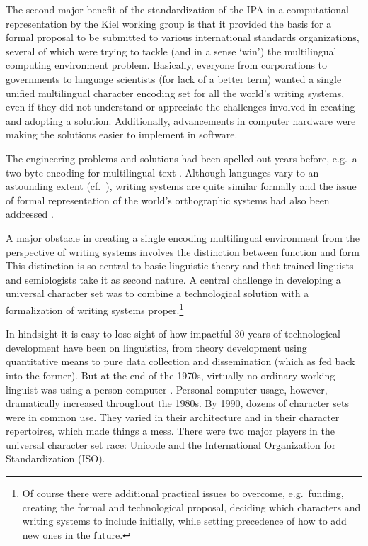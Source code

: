 The second major benefit of the standardization of the IPA in a computational 
representation by the Kiel working group is that it provided the basis for a 
formal proposal to be submitted to various international standards organizations, 
several of which were trying to tackle (and in a sense `win') the multilingual 
computing environment problem. Basically, everyone from corporations to governments 
to language scientists (for lack of a better term) wanted a single unified multilingual 
character encoding set for all the world's writing systems, even if they did not 
understand or appreciate the challenges involved in creating and adopting a solution. 
Additionally, advancements in computer hardware were making the solutions easier 
to implement in software.

The engineering problems and solutions had been spelled out years before, e.g.\ 
a two-byte encoding for multilingual text \citep{Anderson1984}. 
Although languages vary to an astounding extent (cf.\ \cite{EvansLevinson2009}), 
writing systems are quite similar formally and the issue of formal representation 
of the world's orthographic systems had also been addressed \citep{Simons1989}. 

A major obstacle in creating a single encoding multilingual environment from 
the perspective of writing systems involves the distinction between function 
and form \citep{Becker1984} This distinction is so central to basic linguistic 
theory and that trained linguists and semiologists take it as second nature. 
A central challenge in developing a universal character set was to combine a 
technological solution with a formalization of writing systems proper.\footnote{Of 
course there were additional practical issues to overcome, e.g.\ funding, creating 
the formal and technological proposal, deciding which characters and writing systems 
to include initially, while setting precedence of how to add new ones in the future.}

In hindsight it is easy to lose sight of how impactful 30 years of technological 
development have been on linguistics, from theory development using quantitative 
means to pure data collection and dissemination (which as fed back into the former). 
But at the end of the 1970s, virtually no ordinary working linguist was using a 
person computer \cite{Simons1996}. Personal computer usage, however, dramatically 
increased throughout the 1980s. By 1990, dozens of character sets were in common use. 
They varied in their architecture and in their character repertoires, which 
made things a mess. There were two major players in the universal character 
set race: Unicode and the International Organization for Standardization (ISO).

